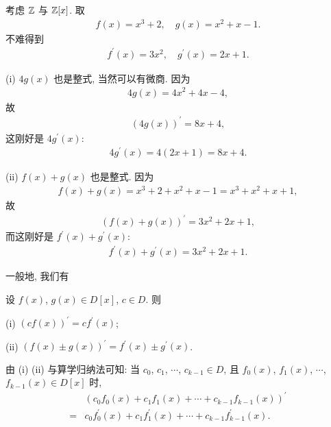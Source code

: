\begin{example}
    考虑 $\mathbb{Z}$ 与 $\mathbb{Z}[x]$. 取
    \begin{align*}
        f(x) = x^3 + 2, \quad g(x) = x^2 + x - 1.
    \end{align*}
    不难得到
    \begin{align*}
        f^{\prime} (x) = 3x^2, \quad g^{\prime} (x) = 2x + 1.
    \end{align*}

    (i) $4g(x)$ 也是整式, 当然可以有微商. 因为
    \begin{align*}
        4g(x) = 4x^2 + 4x - 4,
    \end{align*}
    故
    \begin{align*}
        (4g(x))^{\prime} = 8x + 4,
    \end{align*}
    这刚好是 $4g^{\prime} (x)$:
    \begin{align*}
        4g^{\prime} (x) = 4(2x + 1) = 8x + 4.
    \end{align*}

    (ii) $f(x) + g(x)$ 也是整式. 因为
    \begin{align*}
        f(x) + g(x) = x^3 + 2 + x^2 + x - 1 = x^3 + x^2 + x + 1,
    \end{align*}
    故
    \begin{align*}
        (f(x) + g(x))^{\prime} = 3x^2 + 2x + 1,
    \end{align*}
    而这刚好是 $f^{\prime} (x) + g^{\prime} (x)$:
    \begin{align*}
        f^{\prime} (x) + g^{\prime} (x) = 3x^2 + 2x + 1.
    \end{align*}
\end{example}

一般地, 我们有

\begin{proposition}
    设 $f(x)$, $g(x) \in D[x]$, $c \in D$. 则

    (i) $(cf(x))^{\prime} = c f^{\prime} (x)$;

    (ii) $(f(x) \pm g(x))^{\prime} = f^{\prime} (x) \pm g^{\prime} (x)$.

    由 (i) (ii) 与算学归纳法可知: 当 $c_0$, $c_1$, $\cdots$, $c_{k-1} \in D$, 且 $f_0 (x)$, $f_1 (x)$, $\cdots$, $f_{k-1} (x) \in D[x]$ 时,
    \begin{align*}
             & (c_0 f_0(x) + c_1 f_1(x) + \cdots + c_{k-1} f_{k-1}(x))^{\prime}                  \\
        = {} & c_0 f^{\prime}_0(x) + c_1 f^{\prime}_1(x) + \cdots + c_{k-1} f^{\prime}_{k-1}(x).
    \end{align*}
\end{proposition}

